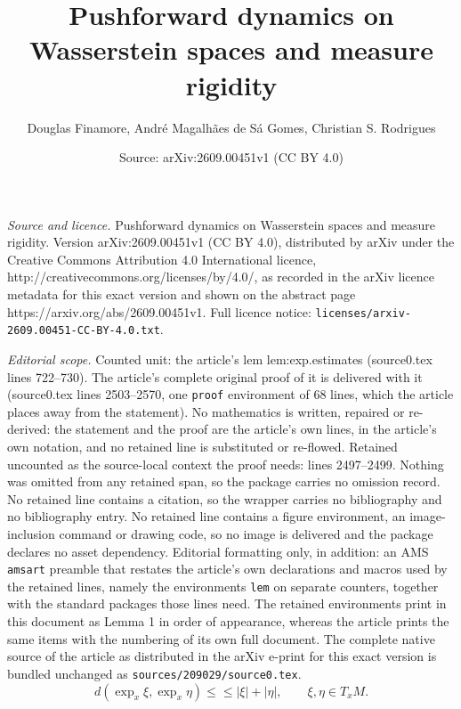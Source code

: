 \documentclass[10pt,a4paper]{amsart}
\title{Pushforward dynamics on Wasserstein spaces and measure rigidity}
\author{Douglas Finamore, Andr\'e Magalh\~aes de S\'a Gomes, Christian S. Rodrigues}
\date{Source: arXiv:2609.00451v1 (CC BY 4.0)}
\begin{document}
\maketitle

\noindent\emph{Source and licence.} Pushforward dynamics on Wasserstein spaces and measure rigidity. Version arXiv:2609.00451v1 (CC BY 4.0), distributed by arXiv under the Creative Commons Attribution 4.0 International licence, http://creativecommons.org/licenses/by/4.0/, as recorded in the arXiv licence metadata for this exact version and shown on the abstract page https://arxiv.org/abs/2609.00451v1. Full licence notice: \texttt{licenses/arxiv-2609.00451-CC-BY-4.0.txt}.\par\smallskip

\noindent\textit{Editorial scope.} Counted unit: the article's lem lem:exp.estimates (source0.tex lines 722--730). The article's complete original proof of it is delivered with it (source0.tex lines 2503--2570, one \texttt{proof} environment of 68 lines, which the article places away from the statement). No mathematics is written, repaired or re-derived: the statement and the proof are the article's own lines, in the article's own notation, and no retained line is substituted or re-flowed.  Retained uncounted as the source-local context the proof needs: lines 2497--2499.  Nothing was omitted from any retained span, so the package carries no omission record.  No retained line contains a citation, so the wrapper carries no bibliography and no bibliography entry.  No retained line contains a figure environment, an image-inclusion command or drawing code, so no image is delivered and the package declares no asset dependency.  Editorial formatting only, in addition: an AMS \texttt{amsart} preamble that restates the article's own declarations and macros used by the retained lines, namely the environments \texttt{lem} on separate counters, together with the standard packages those lines need.  The retained environments print in this document as Lemma 1 in order of appearance, whereas the article prints the same items with the numbering of its own full document.  The complete native source of the article as distributed in the arXiv e-print for this exact version is bundled unchanged as \texttt{sources/209029/source0.tex}.
    \begin{equation}\label{eq:triangle.inequality}
        d\left(\exp_x\xi,\exp_x\eta\right)\le\le\lvert\xi\rvert+\lvert\eta\rvert,\qquad \xi,\eta\in T_xM.
    \end{equation}
\end{document}
